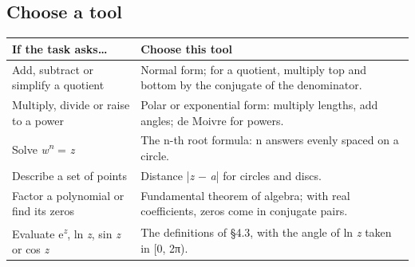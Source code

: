 \documentclass[11pt]{article}
\begin{document}
\begin{keepsection}
\begin{keepsection}
\subsection{Choose a tool}

\begin{center}\small\begin{tabularx}{\linewidth}{>{\raggedright\arraybackslash}X>{\raggedright\arraybackslash}X}\toprule
\textbf{If the task asks…} & \textbf{Choose this tool} \\ \midrule
Add, subtract or simplify a quotient & Normal form; for a quotient, multiply top and bottom by the conjugate of the denominator. \\
Multiply, divide or raise to a power & Polar or exponential form: multiply lengths, add angles; de Moivre for powers. \\
Solve \textit{w}\textsuperscript{\textit{n}} = \textit{z} & The n-th root formula: n answers evenly spaced on a circle. \\
Describe a set of points & Distance |\textit{z} \ensuremath{-} \textit{a}| for circles and discs. \\
Factor a polynomial or find its zeros & Fundamental theorem of algebra; with real coefficients, zeros come in conjugate pairs. \\
Evaluate e\textsuperscript{\textit{z}}, ln \textit{z}, sin \textit{z} or cos \textit{z} & The definitions of §4.3, with the angle of ln \textit{z} taken in [0, 2π). \\
\bottomrule\end{tabularx}\end{center}
\end{keepsection}
\end{keepsection}
\end{document}
